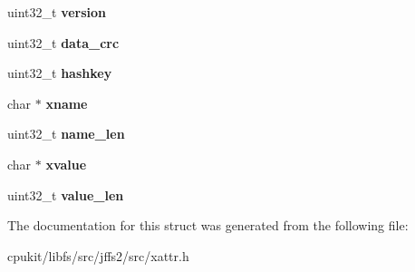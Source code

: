 \begin{DoxyCompactItemize}
\mbox{\label{structjffs2__xattr__datum_a252c64274bf1b67af4ac32533d487bab}} 
uint32\+\_\+t {\bfseries version}
\item 
\mbox{\label{structjffs2__xattr__datum_ace5a8f2d5dad30ac0e1455d305971c6a}} 
uint32\+\_\+t {\bfseries data\+\_\+crc}
\item 
\mbox{\label{structjffs2__xattr__datum_a229023a7eae4f3337d6a3850bd221f15}} 
uint32\+\_\+t {\bfseries hashkey}
\item 
\mbox{\label{structjffs2__xattr__datum_a583e4fb189a6b0ef671cd80bb850d901}} 
char $\ast$ {\bfseries xname}
\item 
\mbox{\label{structjffs2__xattr__datum_ab194f6184ddc59503d23e27c71a8a5e1}} 
uint32\+\_\+t {\bfseries name\+\_\+len}
\item 
\mbox{\label{structjffs2__xattr__datum_aa59d33947141ea906a4c1e756b687e98}} 
char $\ast$ {\bfseries xvalue}
\item 
\mbox{\label{structjffs2__xattr__datum_afee8590e4766ac50fa45f7cfa4613ec5}} 
uint32\+\_\+t {\bfseries value\+\_\+len}
\end{DoxyCompactItemize}


The documentation for this struct was generated from the following file\+:\begin{DoxyCompactItemize}
\item 
cpukit/libfs/src/jffs2/src/xattr.\+h\end{DoxyCompactItemize}
